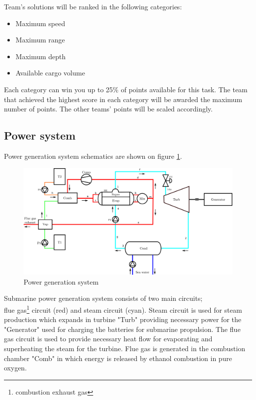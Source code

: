 \documentclass{article}
\begin{document}
	Team's solutions will be ranked in the following categories:
	\begin{itemize}
		\item Maximum speed
		\item Maximum range
		\item Maximum depth
		\item Available cargo volume
	\end{itemize}
    Each category can win you up to 25\% of points available for this task. The 
    team that achieved the highest score in each category will be awarded the 
    maximum number of points. The other teams' points will be scaled 
    accordingly.

	
	
	\subsection{Power system}
	
	Power generation system schematics are shown on figure \ref{fig:pwr_scheme}.
	
	\begin{figure}[h!]
		\centering
		\includegraphics[width=\textwidth]{terma.png}
		\caption{Power generation system}
		\label{fig:pwr_scheme}
	\end{figure}
	
	Submarine power generation system consists of two main circuits; \\
	flue gas\footnote{combustion exhaust gas} circuit (red) and steam 
	circuit (cyan). 
	Steam circuit is used for steam production which expands in turbine "Turb" 
	providing necessary power for the "Generator" used for charging the 
	batteries for submarine propulsion. The flue gas circuit is used to provide 
	necessary heat flow for evaporating and superheating the steam for the 
	turbine. Flue gas is generated in the combustion chamber "Comb" in which 
	energy is released by ethanol combustion in pure oxygen.
	
\end{document}
